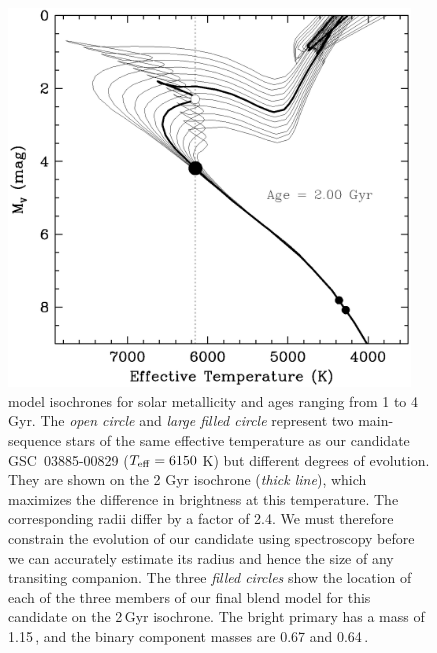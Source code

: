 \begin{figure}
\begin{center}
\includegraphics[width=0.95\textwidth]{3_f2}
\caption[Location of blend model components on isochrones]{\citet{Girardi_Bressan_Bertelli:aas:2000a} model isochrones
  for solar metallicity and ages ranging from 1 to 4 Gyr. 
  The \textit{open circle} and \textit{large filled circle} represent two main-sequence stars of the same effective temperature as our candidate
  \mbox{GSC 03885-00829} ($T_{\rm eff} = 6150$ K) but different
  degrees of evolution. They are shown on the 2 Gyr isochrone ({\it thick
  line}), which maximizes the difference in brightness at this
  temperature. The corresponding radii differ by a factor of 2.4. We
  must therefore constrain the evolution of our candidate using
  spectroscopy before we can accurately estimate its radius and hence
  the size of any transiting companion. The three \textit{filled circles} show
  the location of each of the three members of our final blend model
  for this candidate on the 2\,Gyr isochrone. The bright primary has a
  mass of 1.15\,\msun, and the binary component masses are
  0.67 and 0.64\,\msun.}
\label{cha:gsc:fig:isochrones}
\end{center}
\end{figure}

